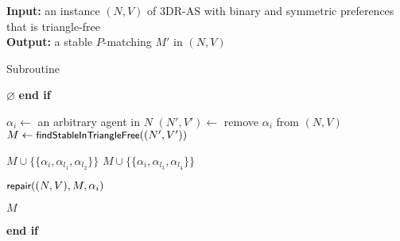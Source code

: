 \begin{algorithm}[t]
\textbf{Input:} an instance $(N,V)$ of 3DR-AS with binary and symmetric preferences that is triangle-free\\
\textbf{Output:} a stable $P$-matching $M'$ in $(N, V)$
\smallskip
\begin{algorithmic}
\caption{Subroutine~ \label{alg:threed_sr_as_find_stable_pmatching_in_triangle_free_instance}} 
    \State \Return $\varnothing$
\EndIf
\State \textbf{end if}
\smallskip

\State $\alpha_i \gets$ an arbitrary agent in $N$
\State $(N', V') \gets $ remove $\alpha_i$ from $(N, V)$
\State $M \gets \algorithmfont{findStableInTriangleFree}((N', V'))$

    \State \Return $M \cup \{ \{ \alpha_{i}, \alpha_{l_1}, \alpha_{l_2} \} \}$
    \State \Return $M \cup \{ \{ \alpha_{i}, \alpha_{l_3}, \alpha_{l_4} \} \}$

\State \Return $\algorithmfont{repair}((N, V), M, \alpha_i)$

\Else

    \State \Return $M$

\EndIf
\State \textbf{end if}


\medskip
\end{algorithmic}
\end{algorithm}